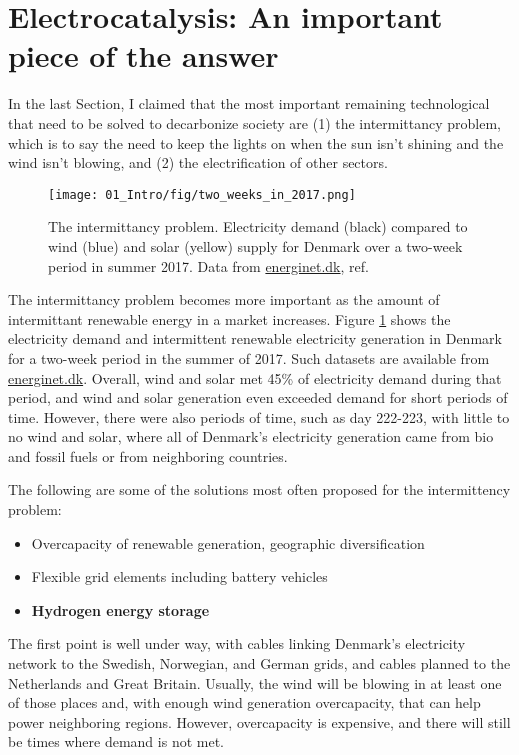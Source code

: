 
\section{Electrocatalysis: An important piece of the answer}\label{sec:our_part}

In the last Section, I claimed that the most important remaining technological that need to be solved to decarbonize society are (1) the intermittancy problem, which is to say the need to keep the lights on when the sun isn't shining and the wind isn't blowing, and (2) the electrification of other sectors.

\begin{figure}[h!]
	\centering
	\texttt{[image: 01\_Intro/fig/two\_weeks\_in\_2017.png]}
	\caption{The intermittancy problem. Electricity demand (black) compared to wind (blue) and solar (yellow) supply for Denmark over a two-week period in summer 2017. Data from \url{energinet.dk}, ref. }
	\label{fig:intermittancy}
\end{figure}

The intermittancy problem becomes more important as the amount of intermittant renewable energy in a market increases. Figure \ref{fig:intermittancy} shows the electricity demand and intermittent renewable electricity generation in Denmark for a two-week period in the summer of 2017. Such datasets are available from \url{energinet.dk}. Overall, wind and solar met 45\% of electricity demand during that period, and wind and solar generation even exceeded demand for short periods of time. However, there were also periods of time, such as day 222-223, with little to no wind and solar, where all of Denmark's electricity generation came from bio and fossil fuels or from neighboring countries.

The following are some of the solutions most often proposed for the intermittency problem\cite{Budischak2013, Sgobbi2016, EU2018}:

\begin{itemize}
	\item Overcapacity of renewable generation, geographic diversification
	
	\item Flexible grid elements including battery vehicles
	
	\item \textbf{Hydrogen energy storage}
\end{itemize}

The first point is well under way, with cables linking Denmark's electricity network to the Swedish, Norwegian, and German grids, and cables planned to the Netherlands and Great Britain. Usually, the wind will be blowing in at least one of those places and, with enough wind generation overcapacity, that can help power neighboring regions. However, overcapacity is expensive, and there will still be times where demand is not met.

